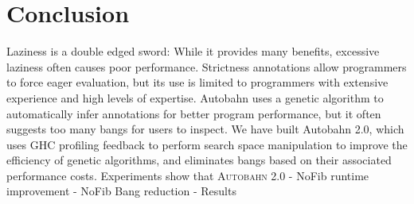 \documentclass[format=sigplan, review=true]{acmart}
\newcommand{\At}[0]{\textsc{Autobahn 2.0}}
\begin{document}
\section{Conclusion}

Laziness is a double edged sword: While it provides many benefits, excessive laziness often causes poor performance. Strictness annotations allow programmers to force eager evaluation, but its use is limited to programmers with extensive experience and high levels of expertise. Autobahn uses a genetic algorithm to automatically infer annotations for better program performance, but it often suggests too many bangs for users to inspect. We have built Autobahn 2.0, which uses GHC profiling feedback to perform search space manipulation to improve the efficiency of genetic algorithms, and eliminates bangs based on their associated performance costs. Experiments show that \At{} 
- NoFib runtime improvement
- NoFib Bang reduction
- Results
\end{document}
